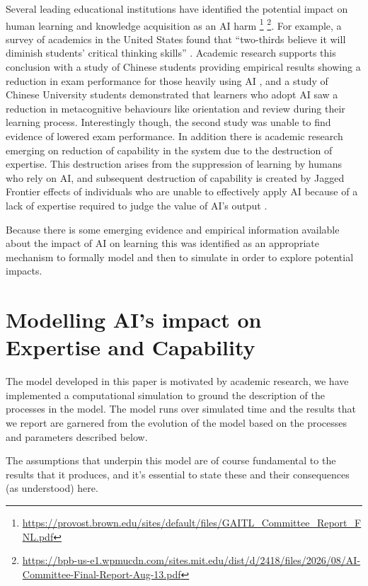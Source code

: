\documentclass[11pt]{article}
\begin{document}
Several leading educational institutions have identified the potential impact on human learning and knowledge acquisition as an AI harm \footnote{\url{https://provost.brown.edu/sites/default/files/GAITL_Committee_Report_FNL.pdf}} \footnote{\url{https://bpb-us-e1.wpmucdn.com/sites.mit.edu/dist/d/2418/files/2026/08/AI-Committee-Final-Report-Aug-13.pdf}}. For example, a survey of academics in the United States found that ``two-thirds believe it will diminish students’ critical thinking skills'' \cite{watson_ai_2025}. Academic research supports this conclusion with a study of Chinese students providing empirical results showing a reduction in exam performance for those heavily using AI \cite{david_stromberg_generative_2026}, and a study of Chinese University students \cite{fan_beware_2025} demonstrated that learners who adopt AI saw a reduction in metacognitive behaviours like orientation and review during their learning process. Interestingly though, the second study was unable to find evidence of lowered exam performance. In addition there is academic research emerging on reduction of capability in the system due to the destruction of expertise.  This destruction arises from the suppression of learning by humans who rely on AI, and subsequent destruction of capability is created by Jagged Frontier effects of individuals who are unable to effectively apply AI because of a lack of expertise required to judge the value of AI's output \cite{fabrizio_dellacqua_navigating_nodate}.  

Because there is some emerging evidence and empirical information available about the impact of AI on learning this was identified as an appropriate mechanism to formally model and then to simulate in order to explore potential impacts. 

\section{Modelling AI's impact on Expertise and Capability} \label{sec:model_expertise_capability}

The model developed in this paper is motivated by academic research, we have implemented a computational simulation to ground the description of the processes in the model. The model runs over simulated time and the results that we report are garnered from the evolution of the model based on the processes and parameters described below. 

The assumptions that underpin this model are of course fundamental to the results that it produces, and it's essential to state these and their consequences (as understood) here. 
\end{document}
